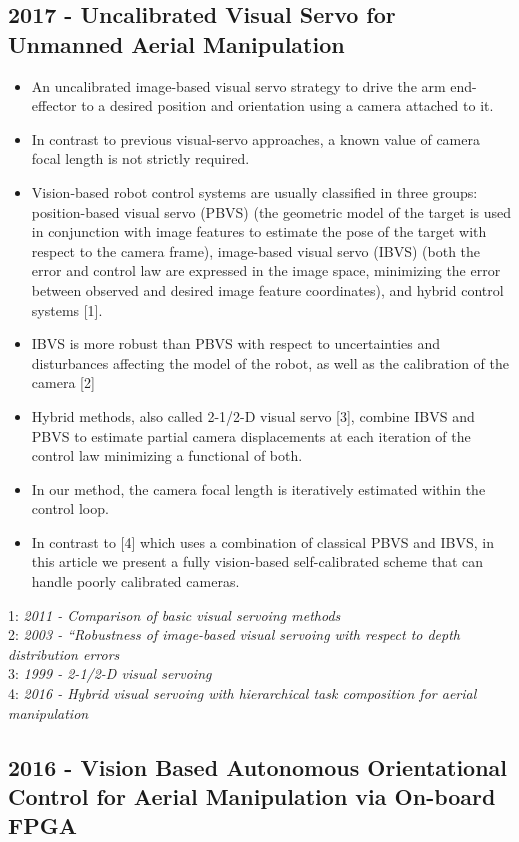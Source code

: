 \subsection{2017 - Uncalibrated Visual Servo for Unmanned Aerial Manipulation}
\begin{itemize}
\item An uncalibrated image-based visual servo strategy to drive the arm end-effector to a desired position and orientation using a camera attached to it. 
\item In contrast to previous visual-servo approaches, a known value of camera focal length is not strictly required. 
\item Vision-based robot control systems are usually classified in three groups: position-based visual servo (PBVS) (the geometric model of the target is used in conjunction with image features to estimate the pose of the target with respect to the camera frame), image-based visual servo (IBVS) (both the error and control law are expressed in the image space, minimizing the error between observed and desired image feature coordinates), and hybrid control systems [1].
\item IBVS is more robust than PBVS with respect to uncertainties and disturbances affecting the model of the robot, as well as the calibration of the camera [2]
\item  Hybrid methods, also called 2-1/2-D visual servo [3], combine IBVS and PBVS to estimate partial camera displacements at each iteration of the control law minimizing a functional of both.
\item In our method, the camera focal length is iteratively estimated within the control loop.
\item In contrast to [4] which uses a combination of classical PBVS and IBVS, in this article we present a fully vision-based self-calibrated scheme that can handle poorly calibrated cameras.
\end{itemize}
1: \textit{2011 - Comparison of basic visual servoing methods} \\
2: \textit{2003 - “Robustness of image-based visual servoing with respect to depth distribution errors} \\
3: \textit{1999 - 2-1/2-D visual servoing} \\
4: \textit{2016 - Hybrid visual servoing with hierarchical task composition for aerial manipulation}


\subsection{2016 - Vision Based Autonomous Orientational Control for Aerial Manipulation via On-board FPGA}

